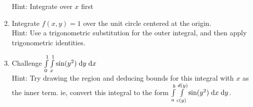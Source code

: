 \documentclass[letterpaper,11pt]{article}
\begin{document}
\begin{enumerate}
      Hint: Integrate over $x$ first\\
      \newline
      \newline
      \newline
    \item Integrate $f(x, y) = 1$ over the unit circle centered at the origin.\\
      Hint: Use a trigonometric substitution for the outer integral, and then apply trigonometric identities.\\
      \newpage
    \item Challenge $\int \limits_{0}^{1} \int \limits_{x}^{1} \sin(y^2) \;\mathrm{d}y \;\mathrm{d}x$\\
      Hint: Try drawing the region and deducing bounds for this integral with $x$ as the inner term.
      ie, convert this integral to the form $\int \limits_{a}^{b} \int \limits_{c(y)}^{d(y)} \sin(y^2) \;\mathrm{d}x \;\mathrm{d}y$.\\
      \newline
      \newline
      \newline
  \end{enumerate}
\end{document}
